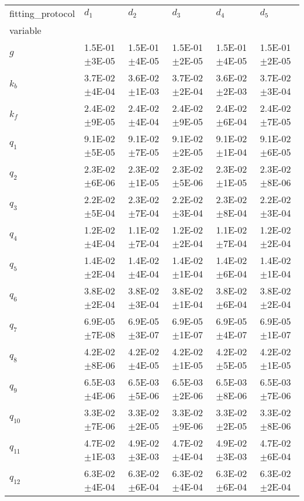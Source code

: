 \begin{tabular}{llllll}
fitting_protocol & $d_1$ & $d_2$ & $d_3$ & $d_4$ & $d_5$ \\
variable &  &  &  &  &  \\
$g$ & 1.5E-01\(\pm\)3E-05 & 1.5E-01\(\pm\)4E-05 & 1.5E-01\(\pm\)2E-05 & 1.5E-01\(\pm\)4E-05 & 1.5E-01\(\pm\)2E-05 \\
$k_b$ & 3.7E-02\(\pm\)4E-04 & 3.6E-02\(\pm\)1E-03 & 3.7E-02\(\pm\)2E-04 & 3.6E-02\(\pm\)2E-03 & 3.7E-02\(\pm\)3E-04 \\
$k_f$ & 2.4E-02\(\pm\)9E-05 & 2.4E-02\(\pm\)4E-04 & 2.4E-02\(\pm\)9E-05 & 2.4E-02\(\pm\)6E-04 & 2.4E-02\(\pm\)7E-05 \\
$q_1$ & 9.1E-02\(\pm\)5E-05 & 9.1E-02\(\pm\)7E-05 & 9.1E-02\(\pm\)2E-05 & 9.1E-02\(\pm\)1E-04 & 9.1E-02\(\pm\)6E-05 \\
$q_2$ & 2.3E-02\(\pm\)6E-06 & 2.3E-02\(\pm\)1E-05 & 2.3E-02\(\pm\)5E-06 & 2.3E-02\(\pm\)1E-05 & 2.3E-02\(\pm\)8E-06 \\
$q_3$ & 2.2E-02\(\pm\)5E-04 & 2.3E-02\(\pm\)7E-04 & 2.2E-02\(\pm\)3E-04 & 2.3E-02\(\pm\)8E-04 & 2.2E-02\(\pm\)3E-04 \\
$q_4$ & 1.2E-02\(\pm\)4E-04 & 1.1E-02\(\pm\)7E-04 & 1.2E-02\(\pm\)2E-04 & 1.1E-02\(\pm\)7E-04 & 1.2E-02\(\pm\)2E-04 \\
$q_5$ & 1.4E-02\(\pm\)2E-04 & 1.4E-02\(\pm\)4E-04 & 1.4E-02\(\pm\)1E-04 & 1.4E-02\(\pm\)6E-04 & 1.4E-02\(\pm\)1E-04 \\
$q_6$ & 3.8E-02\(\pm\)2E-04 & 3.8E-02\(\pm\)3E-04 & 3.8E-02\(\pm\)1E-04 & 3.8E-02\(\pm\)6E-04 & 3.8E-02\(\pm\)2E-04 \\
$q_7$ & 6.9E-05\(\pm\)7E-08 & 6.9E-05\(\pm\)3E-07 & 6.9E-05\(\pm\)1E-07 & 6.9E-05\(\pm\)4E-07 & 6.9E-05\(\pm\)1E-07 \\
$q_8$ & 4.2E-02\(\pm\)8E-06 & 4.2E-02\(\pm\)4E-05 & 4.2E-02\(\pm\)1E-05 & 4.2E-02\(\pm\)5E-05 & 4.2E-02\(\pm\)1E-05 \\
$q_9$ & 6.5E-03\(\pm\)4E-06 & 6.5E-03\(\pm\)5E-06 & 6.5E-03\(\pm\)2E-06 & 6.5E-03\(\pm\)8E-06 & 6.5E-03\(\pm\)7E-06 \\
$q_{10}$ & 3.3E-02\(\pm\)7E-06 & 3.3E-02\(\pm\)2E-05 & 3.3E-02\(\pm\)9E-06 & 3.3E-02\(\pm\)2E-05 & 3.3E-02\(\pm\)8E-06 \\
$q_{11}$ & 4.7E-02\(\pm\)1E-03 & 4.9E-02\(\pm\)3E-03 & 4.7E-02\(\pm\)4E-04 & 4.9E-02\(\pm\)3E-03 & 4.7E-02\(\pm\)6E-04 \\
$q_{12}$ & 6.3E-02\(\pm\)4E-04 & 6.3E-02\(\pm\)6E-04 & 6.3E-02\(\pm\)4E-04 & 6.3E-02\(\pm\)6E-04 & 6.3E-02\(\pm\)2E-04 \\
\end{tabular}
